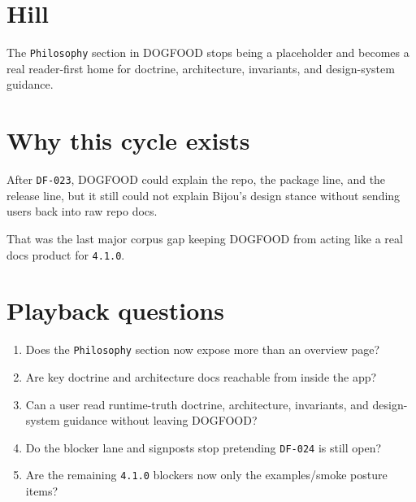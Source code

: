 \section{Hill}\label{record-085-hill}

The \texttt{P\allowbreak{}h\allowbreak{}i\allowbreak{}l\allowbreak{}o\allowbreak{}s\allowbreak{}o\allowbreak{}p\allowbreak{}h\allowbreak{}y} section in DOGFOOD stops being a placeholder and becomes a real reader-first home for doctrine, architecture, invariants, and design-system guidance.

\section{Why this cycle exists}\label{record-085-why-this-cycle-exists}

After \texttt{D\allowbreak{}F\allowbreak{}-\allowbreak{}0\allowbreak{}2\allowbreak{}3}, DOGFOOD could explain the repo, the package line, and the release line, but it still could not explain Bijou's design stance without sending users back into raw repo docs.

That was the last major corpus gap keeping DOGFOOD from acting like a real docs product for \texttt{4\allowbreak{}.\allowbreak{}1\allowbreak{}.\allowbreak{}0}.

\section{Playback questions}\label{record-085-playback-questions}

\begin{enumerate}
\def\labelenumi{\arabic{enumi}.}
\tightlist
\item
  Does the \texttt{P\allowbreak{}h\allowbreak{}i\allowbreak{}l\allowbreak{}o\allowbreak{}s\allowbreak{}o\allowbreak{}p\allowbreak{}h\allowbreak{}y} section now expose more than an overview page?
\item
  Are key doctrine and architecture docs reachable from inside the app?
\item
  Can a user read runtime-truth doctrine, architecture, invariants, and design-system guidance without leaving DOGFOOD?
\item
  Do the blocker lane and signposts stop pretending \texttt{D\allowbreak{}F\allowbreak{}-\allowbreak{}0\allowbreak{}2\allowbreak{}4} is still open?
\item
  Are the remaining \texttt{4\allowbreak{}.\allowbreak{}1\allowbreak{}.\allowbreak{}0} blockers now only the examples/smoke posture items?
\end{enumerate}


